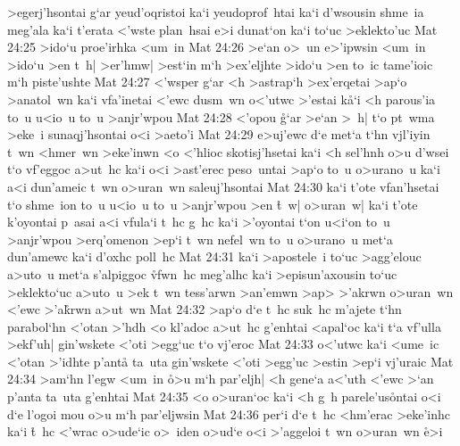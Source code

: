 >egerj'hsontai
g`ar
yeud'oqristoi
ka`i
yeudoprof~htai
ka`i
d'wsousin
shme~ia
meg'ala
ka`i
t'erata
<'wste
plan~hsai
e>i
dunat`on
ka`i
to`uc
>eklekto'uc\bibvsend
\vs Mat 24:25
>ido`u
proe'irhka
<um~in\bibvsend
\vs Mat 24:26
>e`an
o>~un
e>'ipwsin
<um~in
>ido`u
>en
t~h|
>er'hmw|
>est`in
m`h
>ex'eljhte
>ido`u
>en
to~ic
tame'ioic
m`h
piste'ushte\bibvsend
\vs Mat 24:27
<'wsper
g`ar
<h
>astrap`h
>ex'erqetai
>ap`o
>anatol~wn
ka`i
vfa'inetai
<'ewc
dusm~wn
o<'utwc
>'estai
k\r{a}`i
<h
parous'ia
to~u
u<io~u
to~u
>anjr'wpou\bibvsend
\vs Mat 24:28
<'opou
\r{g}`ar
>e`an
>~h|
t`o
pt~wma
>eke~i
sunaqj'hsontai
o<i
>aeto'i\bibvsend
\vs Mat 24:29
e>uj'ewc
d`e
met`a
t`hn
vjl'iyin
t~wn
<hmer~wn
>eke'inwn
<o
<'hlioc
skotisj'hsetai
ka`i
<h
sel'hnh
o>u
d'wsei
t`o
vf'eggoc
a>ut~hc
ka`i
o<i
>ast'erec
peso~untai
>ap`o
to~u
o>urano~u
ka`i
a<i
dun'ameic
t~wn
o>uran~wn
saleuj'hsontai\bibvsend
\vs Mat 24:30
ka`i
t'ote
vfan'hsetai
t`o
shme~ion
to~u
u<io~u
to~u
>anjr'wpou
>en
\r{t}~w|
o>uran~w|
ka`i
t'ote
k'oyontai
p~asai
a<i
vfula`i
t~hc
g~hc
ka`i
>'oyontai
t`on
u<i`on
to~u
>anjr'wpou
>erq'omenon
>ep`i
t~wn
nefel~wn
to~u
o>urano~u
met`a
dun'amewc
ka`i
d'oxhc
poll~hc\bibvsend
\vs Mat 24:31
ka`i
>apostele~i
to`uc
>agg'elouc
a>uto~u
met`a
s'alpiggoc
\r{vf}wn~hc
meg'alhc
ka`i
>episun'axousin
to`uc
>eklekto`uc
a>uto~u
>ek
t~wn
tess'arwn
>an'emwn
>ap>
>'akrwn
o>uran~wn
<'ewc
>'a\r{k}rwn
a>ut~wn\bibvsend
\vs Mat 24:32
>ap`o
d`e
t~hc
suk~hc
m'ajete
t`hn
parabol`hn
<'otan
>'hdh
<o
kl'adoc
a>ut~hc
g'enhtai
<apal`oc
ka`i
t`a
vf'ulla
>ekf'uh|
gin'wskete
<'oti
>egg`uc
t`o
vj'eroc\bibvsend
\vs Mat 24:33
o<'utwc
ka`i
<ume~ic
<'otan
>'idhte
p'anta\r{}
ta~uta
gin'wskete
<'oti
>egg'uc
>estin
>ep`i
vj'uraic\bibvsend
\vs Mat 24:34
>am`hn
l'egw
<um~in
\r{o}>u
m`h
par'eljh|
<h
gene`a
a<'uth
<'ewc
>`an
p'anta
ta~uta
g'enhtai\bibvsend
\vs Mat 24:35
<o
o>uran`oc
ka`i
<h
g~h
parele'us\r{o}ntai
o<i
d`e
l'ogoi
mou
o>u
m`h
par'eljwsin\bibvsend
\vs Mat 24:36
per`i
d`e
t~hc
<hm'erac
>eke'inhc
ka`i
\r{t}~hc
<'wrac
o>ude`ic
o>~iden
o>ud`e
o<i
>'aggeloi
t~wn
o>uran~wn
\r{e}>i
